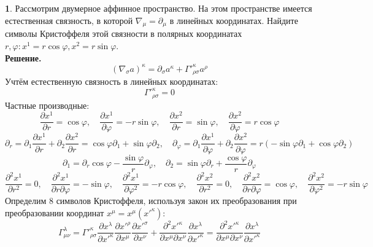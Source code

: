 \documentclass[12pt]{article}
\theoremstyle{definition}
\newtheorem{zad}{}[section]
\begin{document}
\begin{zad}
Рассмотрим двумерное аффинное пространство. На этом пространстве имеется естественная связность, в которой $\nabla_\mu=\partial_\mu$ в линейных координатах. Найдите символы Кристоффеля этой связности в полярных координатах $r,\varphi:x^1=r\cos\varphi,x^2=r\sin\varphi$.\\
\textbf{Решение.}\\
\begin{equation}
    (\nabla_\sigma a)^\kappa=\partial_\sigma a^\kappa+\Gamma'^\kappa_{\rho\sigma}a^\rho
\end{equation}
Учтём естественную связность в линейных координатах:
\begin{equation}
    \Gamma'^\kappa_{\rho\sigma}=0
\end{equation}
Частные производные:
\begin{equation}
    \frac{\partial x^1}{\partial r}=\cos\varphi, \quad \frac{\partial x^1}{\partial \varphi}=-r\sin\varphi,\quad \frac{\partial x^2}{\partial r}=\sin\varphi,\quad \frac{\partial x^2}{\partial\varphi}=r\cos\varphi
\end{equation}
\begin{equation}
    \partial_r=\partial_1\frac{\partial x^1}{\partial r}+\partial_2\frac{\partial x^2}{\partial r}=\cos\varphi\partial_1+\sin\varphi\partial_2,\quad\partial_\varphi=\partial_1\frac{\partial x^1}{\partial \varphi}+\partial_2\frac{\partial x^2}{\partial\varphi}=r(-\sin\varphi\partial_1+\cos\varphi\partial_2)
\end{equation}
\begin{equation}
    \partial_1=\partial_r\cos\varphi-\frac{\sin\varphi}{r}\partial_\varphi,\quad \partial_2=\sin\varphi\partial_r+\frac{\cos\varphi}{r}\partial_\varphi
\end{equation}
\begin{equation*}
    \frac{\partial^2 x^1}{\partial r^2}=0, \quad \frac{\partial^2 x^1}{\partial r\partial\varphi}=-\sin\varphi, \quad \frac{\partial^2 x^1}{\partial \varphi^2}=-r\cos\varphi, \quad \frac{\partial^2 x^2}{\partial r^2}=0,\quad \frac{\partial^2 x^2}{\partial r\partial\varphi}=\cos\varphi,\quad \frac{\partial^2 x^2}{\partial\varphi^2}=-r\sin\varphi
\end{equation*}
Определим 8 символов Кристоффеля, используя закон их преобразования при преобразовании координат $x^\mu=x^\mu(x'^\kappa)$:
\begin{equation}
    \Gamma^\lambda_{\mu\nu}=\Gamma'^\kappa_{\rho\sigma}\frac{\partial x^\lambda}{\partial x'^\kappa}\frac{\partial x'^\rho}{\partial x^\mu}\frac{\partial x'^\sigma}{\partial x^\nu}+\frac{\partial^2 x'^\kappa}{\partial x^\mu\partial x^\nu}\frac{\partial x^\lambda}{\partial x'^\kappa}=\frac{\partial^2 x'^\kappa}{\partial x^\mu\partial x^\nu}\frac{\partial x^\lambda}{\partial x'^\kappa}

\end{equation}
\end{zad}
\end{document}

